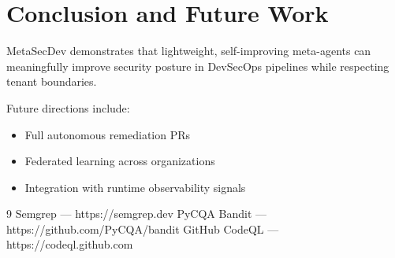 \documentclass[10pt,a4paper]{article}
\begin{document}
\section{Conclusion and Future Work}

MetaSecDev demonstrates that lightweight, self-improving meta-agents can meaningfully improve security posture in DevSecOps pipelines while respecting tenant boundaries.

Future directions include:
\begin{itemize}
    \item Full autonomous remediation PRs
    \item Federated learning across organizations
    \item Integration with runtime observability signals
\end{itemize}


\begin{thebibliography}{9}
 Semgrep — https://semgrep.dev
 PyCQA Bandit — https://github.com/PyCQA/bandit
 GitHub CodeQL — https://codeql.github.com
\end{thebibliography}
\end{document}
